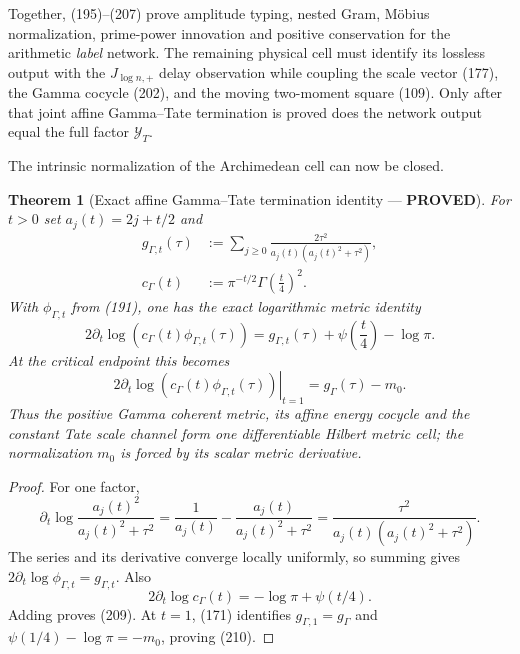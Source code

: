 \documentclass[11pt]{article}
\newtheorem{theorem}{Theorem}
\newcommand{\PROVED}{\textcolor{green!45!black}{\textbf{PROVED}}}
\begin{document}
Together, (195)--(207) prove amplitude typing, nested Gram, M\"obius
normalization, prime-power innovation and positive conservation for the
arithmetic \emph{label} network.  The remaining physical cell must identify
its lossless output with the $J_{\log n,+}$ delay observation while coupling
the scale vector (177), the Gamma cocycle (202), and the moving two-moment
square (109).  Only after that joint affine Gamma--Tate termination is proved
does the network output equal the full factor $\mathcal Y_T$.

The intrinsic normalization of the Archimedean cell can now be closed.

\begin{theorem}[Exact affine Gamma--Tate termination identity --- \PROVED]
For $t>0$ set $a_j(t)=2j+t/2$ and
\begin{align}
 g_{\Gamma,t}(\tau)
 &:=\sum_{j\ge0}\frac{2\tau^2}
 {a_j(t)(a_j(t)^2+\tau^2)},                            \tag{208}\\
 c_\Gamma(t)&:=\pi^{-t/2}\Gamma\left(\frac t4\right)^2.
\end{align}
With $\phi_{\Gamma,t}$ from (191), one has the exact logarithmic metric
identity
\begin{equation}
 2\partial_t\log\!\left(c_\Gamma(t)\phi_{\Gamma,t}(\tau)\right)
 =g_{\Gamma,t}(\tau)+\psi\left(\frac t4\right)-\log\pi. \tag{209}
\end{equation}
At the critical endpoint this becomes
\begin{equation}
 \left.2\partial_t\log\!\left(
 c_\Gamma(t)\phi_{\Gamma,t}(\tau)\right)\right|_{t=1}
 =g_\Gamma(\tau)-m_0.                                 \tag{210}
\end{equation}
Thus the positive Gamma coherent metric, its affine energy cocycle and the
constant Tate scale channel form one differentiable Hilbert metric cell; the
normalization $m_0$ is forced by its scalar metric derivative.
\end{theorem}

\begin{proof}
For one factor,
\[
 \partial_t\log\frac{a_j(t)^2}{a_j(t)^2+\tau^2}
 =\frac1{a_j(t)}-\frac{a_j(t)}{a_j(t)^2+\tau^2}
 =\frac{\tau^2}{a_j(t)(a_j(t)^2+\tau^2)}.
\]
The series and its derivative converge locally uniformly, so summing gives
$2\partial_t\log\phi_{\Gamma,t}=g_{\Gamma,t}$.  Also
\[
 2\partial_t\log c_\Gamma(t)
 =-\log\pi+\psi(t/4).
\]
Adding proves (209).  At $t=1$, (171) identifies
$g_{\Gamma,1}=g_\Gamma$ and
$\psi(1/4)-\log\pi=-m_0$, proving (210).
\end{proof}
\end{document}
